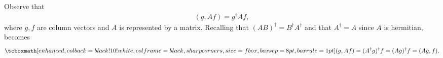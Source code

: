 
Observe that
\begin{align}
    \label{eq:expand-inner-prod}
    (g,Af) = g^{\dagger}Af
,\end{align}
where $g,f$ are column vectors and $A$ is represented by a matrix.
Recalling that $(AB)^{\dagger} = B^{\dagger}A^{\dagger}$ and that $A^{\dagger} = A$ since $A$ is hermitian,  becomes
\begin{eqnarray}
    \label{eq:inner-prod-result}
    \eqbox{
    (g,Af) = (A^{\dagger}g)^{\dagger}f = (A g)^{\dagger} f = (Ag,f)
}
.\end{eqnarray}





